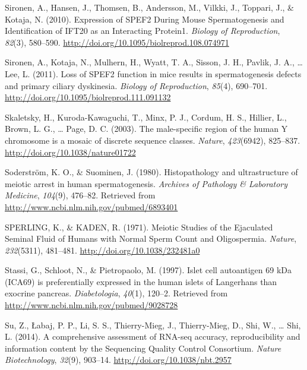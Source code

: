 \documentclass[12pt,twoside]{reedthesis}
\theoremstyle{definition}
\theoremstyle{definition}
\theoremstyle{remark}
\begin{document}
  \hypertarget{ref-Sironen2010}{}
  Sironen, A., Hansen, J., Thomsen, B., Andersson, M., Vilkki, J.,
  Toppari, J., \& Kotaja, N. (2010). Expression of SPEF2 During Mouse
  Spermatogenesis and Identification of IFT20 as an Interacting Protein1.
  \emph{Biology of Reproduction}, \emph{82}(3), 580--590.
  \url{http://doi.org/10.1095/biolreprod.108.074971}
  
  \hypertarget{ref-Sironen2011}{}
  Sironen, A., Kotaja, N., Mulhern, H., Wyatt, T. A., Sisson, J. H.,
  Pavlik, J. A., \ldots{} Lee, L. (2011). Loss of SPEF2 function in mice
  results in spermatogenesis defects and primary ciliary dyskinesia.
  \emph{Biology of Reproduction}, \emph{85}(4), 690--701.
  \url{http://doi.org/10.1095/biolreprod.111.091132}
  
  \hypertarget{ref-Skaletsky2003}{}
  Skaletsky, H., Kuroda-Kawaguchi, T., Minx, P. J., Cordum, H. S.,
  Hillier, L., Brown, L. G., \ldots{} Page, D. C. (2003). The
  male-specific region of the human Y chromosome is a mosaic of discrete
  sequence classes. \emph{Nature}, \emph{423}(6942), 825--837.
  \url{http://doi.org/10.1038/nature01722}
  
  \hypertarget{ref-Soderstrom1980}{}
  Soderström, K. O., \& Suominen, J. (1980). Histopathology and
  ultrastructure of meiotic arrest in human spermatogenesis.
  \emph{Archives of Pathology \& Laboratory Medicine}, \emph{104}(9),
  476--82. Retrieved from \url{http://www.ncbi.nlm.nih.gov/pubmed/6893401}
  
  \hypertarget{ref-SPERLING1971}{}
  SPERLING, K., \& KADEN, R. (1971). Meiotic Studies of the Ejaculated
  Seminal Fluid of Humans with Normal Sperm Count and Oligospermia.
  \emph{Nature}, \emph{232}(5311), 481--481.
  \url{http://doi.org/10.1038/232481a0}
  
  \hypertarget{ref-Stassi1997}{}
  Stassi, G., Schloot, N., \& Pietropaolo, M. (1997). Islet cell
  autoantigen 69 kDa (ICA69) is preferentially expressed in the human
  islets of Langerhans than exocrine pancreas. \emph{Diabetologia},
  \emph{40}(1), 120--2. Retrieved from
  \url{http://www.ncbi.nlm.nih.gov/pubmed/9028728}
  
  \hypertarget{ref-Su2014}{}
  Su, Z., Łabaj, P. P., Li, S. S., Thierry-Mieg, J., Thierry-Mieg, D.,
  Shi, W., \ldots{} Shi, L. (2014). A comprehensive assessment of RNA-seq
  accuracy, reproducibility and information content by the Sequencing
  Quality Control Consortium. \emph{Nature Biotechnology}, \emph{32}(9),
  903--14. \url{http://doi.org/10.1038/nbt.2957}
  
\end{document}
